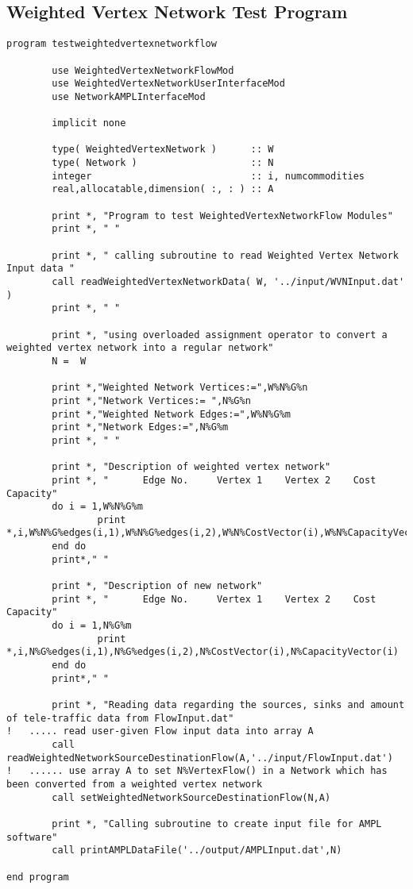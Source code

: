 \documentclass[10pt,a4paper,margin = 1.25cm]{article}
\begin{document}
\subsection*{Weighted Vertex Network Test Program}
\begin{lstlisting}
program testweightedvertexnetworkflow
		
		use WeightedVertexNetworkFlowMod
		use WeightedVertexNetworkUserInterfaceMod
		use NetworkAMPLInterfaceMod
		
		implicit none
		
		type( WeightedVertexNetwork )      :: W
		type( Network )                    :: N
		integer                            :: i, numcommodities
		real,allocatable,dimension( :, : ) :: A
		
		print *, "Program to test WeightedVertexNetworkFlow Modules"
		print *, " "
		
		print *, " calling subroutine to read Weighted Vertex Network Input data "
		call readWeightedVertexNetworkData( W, '../input/WVNInput.dat' )
		print *, " "
		
		print *, "using overloaded assignment operator to convert a weighted vertex network into a regular network"
		N =  W
		
		print *,"Weighted Network Vertices:=",W%N%G%n
		print *,"Network Vertices:= ",N%G%n
		print *,"Weighted Network Edges:=",W%N%G%m
		print *,"Network Edges:=",N%G%m		
		print *, " "
		
		print *, "Description of weighted vertex network"
		print *, "      Edge No.     Vertex 1    Vertex 2    Cost    Capacity"
		do i = 1,W%N%G%m
				print *,i,W%N%G%edges(i,1),W%N%G%edges(i,2),W%N%CostVector(i),W%N%CapacityVector(i)
		end do
		print*," "
		
		print *, "Description of new network"
		print *, "      Edge No.     Vertex 1    Vertex 2    Cost    Capacity"
		do i = 1,N%G%m
				print *,i,N%G%edges(i,1),N%G%edges(i,2),N%CostVector(i),N%CapacityVector(i)
		end do
		print*," "
		
		print *, "Reading data regarding the sources, sinks and amount of tele-traffic data from FlowInput.dat"
!   ..... read user-given Flow input data into array A
		call readWeightedNetworkSourceDestinationFlow(A,'../input/FlowInput.dat')
!   ...... use array A to set N%VertexFlow() in a Network which has been converted from a weighted vertex network
		call setWeightedNetworkSourceDestinationFlow(N,A)
		
		print *, "Calling subroutine to create input file for AMPL software"
		call printAMPLDataFile('../output/AMPLInput.dat',N)
		
end program
\end{lstlisting}
\end{document}
